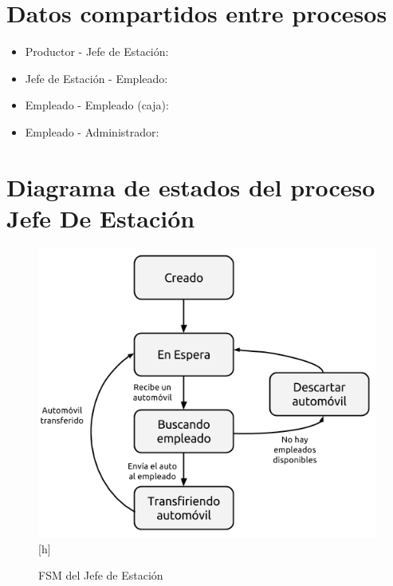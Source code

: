 \documentclass[12pt,a4paper,spanish]{article}
\begin{document}
	\section{Datos compartidos entre procesos}
	
	\begin{itemize}
	
	\item Productor - Jefe de Estación:
	
	\item Jefe de Estación - Empleado:
	
	\item Empleado - Empleado (caja):
	
	\item Empleado - Administrador:
	
	\end{itemize}

	\section{Diagrama de estados del proceso Jefe De Estación}

	\begin{figure}
	\includegraphics[width=1.0\textwidth]{FSM_JDE.png}[h]
	\caption{FSM del Jefe de Estación}
	\end{figure}
\end{document}
